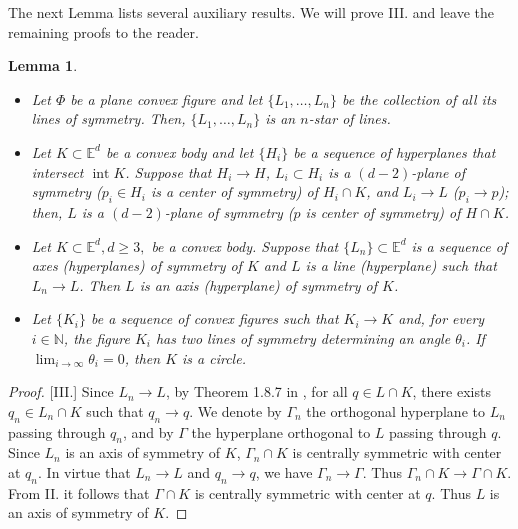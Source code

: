\documentclass[12pt,thmsa]{amsart}
\newcommand{\Ed}{\mathbb{E}^{d}}
\newcommand{\inte}{\operatorname*{int}}
\newtheorem{lemma}{Lemma}
\begin{document}
The next Lemma lists several auxiliary results. We will prove III. and leave the remaining proofs to the reader. 

\begin{lemma}\label{contento}


\begin{itemize}

$~$

\item[I.] Let $\Phi$ be a plane convex figure and let   $\{L_1,\ldots, L_n \}$ be the collection of all its lines 
of symmetry. Then,  $\{L_1,\ldots,L_n \}$ is an $n$-star of lines.
 
\item[II.] Let $K \subset \Ed$ be a convex body and let $\{H_i \}$ be a sequence of hyperplanes that intersect $\inte K$. Suppose that $H_i \rightarrow H$, $L_i \subset H_i$ is a $(d-2)$-plane of symmetry ($p_i \in H_i$ is a center of symmetry) of $H_i \cap K$, and $L_i \rightarrow  L$ ($p_i \rightarrow  p$); then, $L$ is a $(d-2)$-plane of symmetry ($p$ is center of symmetry) of $H \cap K$. 

\item[III.] Let $K\subset \Ed, d\geq3,$ be a convex body. Suppose that $\{L_n\} \subset \Ed$ is a sequence of axes (hyperplanes) of symmetry of $K$ and $L$ is a line (hyperplane) such that $L_n \rightarrow L$. Then $L$ is an axis (hyperplane) of symmetry of $K$.

\item[IV.] Let $\{K_i\}$ be a sequence of convex figures such that  $K_i \rightarrow K$ and, for every $i\in\mathbb{N}$, the figure $K_i$ has two lines of symmetry determining an angle $\theta_i$. If 
$\lim_{i\to\infty}\theta_i=0$, then  $K$ is a circle.
\end{itemize}

\end{lemma}



\begin{proof}

[III.]  Since $L_n \rightarrow L$, by Theorem 1.8.7 in \cite{sch}, for all $q\in L \cap K$, there exists $q_n \in L_n \cap K$ such that $q_n \rightarrow q$. We denote by $\Gamma_n$  the orthogonal hyperplane to $L_n$ passing through $q_n$, and by $\Gamma$ the hyperplane orthogonal to $L$ passing through $q$. Since $L_n$ is an axis of symmetry of  $K$, $\Gamma_n \cap K$ is centrally symmetric with center at $q_n$. In virtue that $L_n \rightarrow L$ and $q_n \rightarrow q$, we have $\Gamma_n \rightarrow \Gamma$. Thus $\Gamma_n \cap K \rightarrow \Gamma \cap K$. From II. it follows that $\Gamma \cap K$ is centrally symmetric with center at $q$. Thus $L$ is an axis of symmetry of $K$.
\end{proof} 
\end{document}
